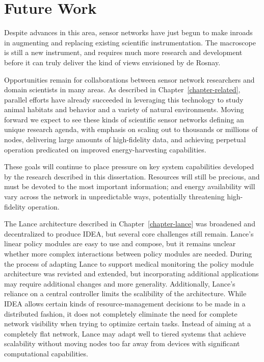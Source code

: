 \section{Future Work}

Despite advances in this area, sensor networks have just begun to make
inroads in augmenting and replacing existing scientific instrumentation. The
macroscope is still a new instrument, and requires much more research and
development before it can truly deliver the kind of views envisioned by de
Rosnay.

Opportunities remain for collaborations between sensor network researchers
and domain scientists in many areas. As described in
Chapter~\ref{chapter-related}, parallel efforts have already succeeded in
leveraging this technology to study animal habitats and behavior and a
variety of natural environments. Moving forward we expect to see these kinds
of scientific sensor networks defining an unique research agenda, with
emphasis on scaling out to thousands or millions of nodes, delivering large
amounts of high-fidelity data, and achieving perpetual operation predicated
on improved energy-harvesting capabilities.

These goals will continue to place pressure on key system capabilities
developed by the research described in this dissertation. Resources will
still be precious, and must be devoted to the most important information; and
energy availability will vary across the network in unpredictable ways,
potentially threatening high-fidelity operation.

The Lance architecture described in Chapter~\ref{chapter-lance} was broadened
and decentralized to produce IDEA, but several core challenges still remain.
Lance's linear policy modules are easy to use and compose, but it remains
unclear whether more complex interactions between policy modules are needed.
During the process of adapting Lance to support medical monitoring the policy
module architecture was revisted and extended, but incorporating additional
applications may require additional changes and more generality.
Additionally, Lance's reliance on a central controller limits the scalibility
of the architecture. While IDEA allows certain kinds of resource-management
decisions to be made in a distributed fashion, it does not completely
eliminate the need for complete network visibility when trying to optimize
certain tasks. Instead of aiming at a completely flat network, Lance may
adapt well to tiered systems that achieve scalability without moving nodes
too far away from devices with significant computational capabilities.

